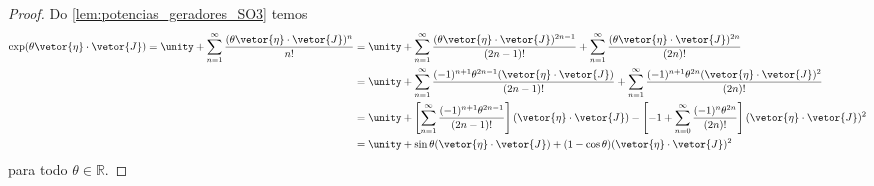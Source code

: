 \begin{proof}
    Do \cref{lem:potencias_geradores_SO3} temos
    \begin{align*}
        \exp(\theta \vetor{\eta} \cdot \vetor{J}) = \unity + \sum_{n = 1}^\infty \frac{(\theta \vetor{\eta}\cdot \vetor{J})^n}{n!}
        &= \unity + \sum_{n = 1}^\infty \frac{(\theta \vetor{\eta} \cdot \vetor{J})^{2n - 1}}{(2n - 1)!} + \sum_{n = 1}^\infty \frac{(\theta \vetor{\eta} \cdot \vetor{J})^{2n}}{(2n)!}\\
        &= \unity + \sum_{n = 1}^\infty \frac{(-1)^{n + 1}\theta^{2n - 1}(\vetor{\eta} \cdot \vetor{J})}{(2n - 1)!} + \sum_{n = 1}^\infty \frac{(-1)^{n+1}\theta^{2n} (\vetor{\eta} \cdot \vetor{J})^{2}}{(2n)!}\\
        &= \unity + \left[\sum_{n = 1}^\infty \frac{(-1)^{n + 1}\theta^{2n - 1}}{(2n - 1)!}\right](\vetor{\eta} \cdot \vetor{J}) - \left[-1 + \sum_{n = 0}^\infty \frac{(-1)^{n}\theta^{2n} }{(2n)!}\right](\vetor{\eta} \cdot \vetor{J})^{2}\\
        &= \unity + \sin\theta (\vetor{\eta} \cdot \vetor{J}) + (1 - \cos\theta) (\vetor{\eta}\cdot \vetor{J})^2
    \end{align*}
    para todo \(\theta \in \mathbb{R}\).


\end{proof}
